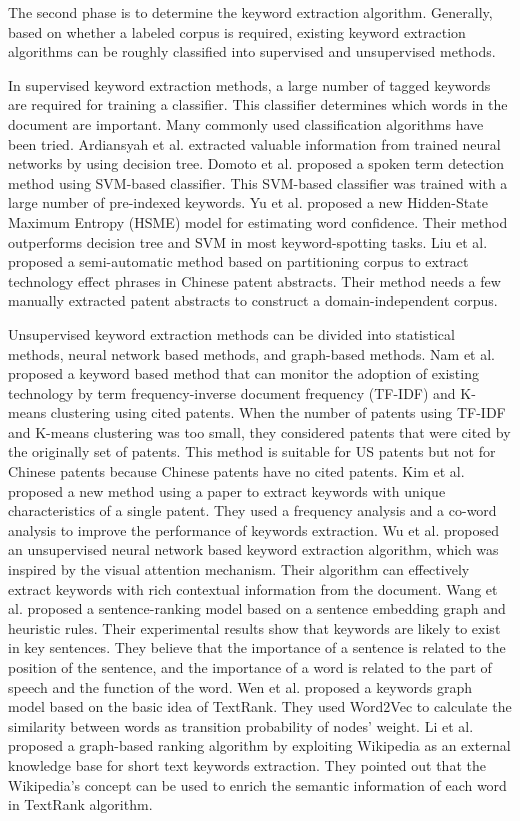 \documentclass[conference]{IEEEtran}
\begin{document}
	The second phase is to determine the keyword extraction algorithm. Generally, based on whether a labeled corpus is required, existing keyword extraction algorithms can be roughly classified into supervised and unsupervised methods.
	
	In supervised keyword extraction methods, a large number of tagged keywords are required for training a classifier. This classifier determines which words in the document are important. Many commonly used classification algorithms have been tried. Ardiansyah et al. \cite{b15} extracted valuable information from trained neural networks by using decision tree. Domoto et al. \cite{b16} proposed a spoken term detection method using SVM-based classifier. This SVM-based classifier was trained with a large number of pre-indexed keywords. Yu et al. \cite{b17} proposed a new Hidden-State Maximum Entropy (HSME) model for estimating word confidence. Their method outperforms decision tree and SVM in most keyword-spotting tasks. Liu et al. \cite{b18} proposed a semi-automatic method based on partitioning corpus to extract technology effect phrases in Chinese patent abstracts. Their method needs a few manually extracted patent abstracts to construct a domain-independent corpus.
	
	Unsupervised keyword extraction methods can be divided into statistical methods, neural network based methods, and graph-based methods. Nam et al. \cite{b19} proposed a keyword based method that can monitor the adoption of existing technology by term frequency-inverse document frequency (TF-IDF) and K-means clustering using cited patents. When the number of patents using TF-IDF and K-means clustering was too small, they considered patents that were cited by the originally set of patents. This method is suitable for US patents but not for Chinese patents because Chinese patents have no cited patents. Kim et al. \cite{b20} proposed a new method using a paper to extract keywords with unique characteristics of a single patent. They used a frequency analysis and a co-word analysis to improve the performance of keywords extraction. Wu et al. \cite{b21} proposed an unsupervised neural network based keyword extraction algorithm, which was inspired by the visual attention mechanism. Their algorithm can effectively extract keywords with rich contextual information from the document. Wang et al. \cite{b22} proposed a sentence-ranking model based on a sentence embedding graph and heuristic rules. Their experimental results show that keywords are likely to exist in key sentences. They believe that the importance of a sentence is related to the position of the sentence, and the importance of a word is related to the part of speech and the function of the word. Wen et al. \cite{b23} proposed a keywords graph model based on the basic idea of TextRank. They used Word2Vec to calculate the similarity between words as transition probability of nodes' weight. Li et al. \cite{b24} proposed a graph-based ranking algorithm by exploiting Wikipedia as an external knowledge base for short text keywords extraction. They pointed out that the Wikipedia's concept can be used to enrich the semantic information of each word in TextRank algorithm.
	
\end{document}
